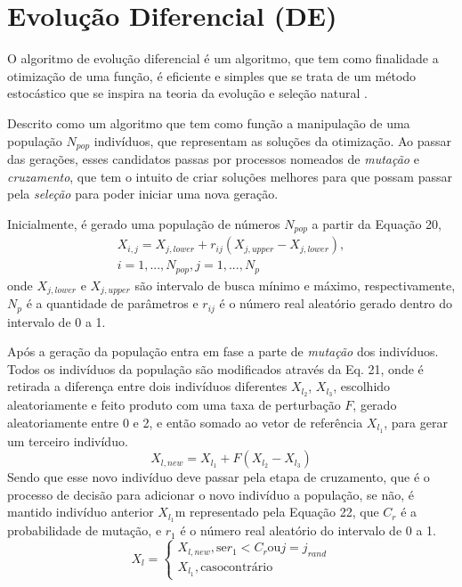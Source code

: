 \documentclass[por]{Template_SBEF}
\begin{document}
\section{Evolução Diferencial (DE)}
O algoritmo de evolução diferencial é um algoritmo, que tem como finalidade a otimização de uma função, é eficiente e simples que se trata de um método estocástico que se inspira na teoria da evolução e seleção natural \cite{Storn}.

Descrito como um algoritmo que tem como função a manipulação de uma população $N_{pop}$ indivíduos, que representam as soluções da otimização\cite{leppaus}. Ao passar das gerações, esses candidatos passas por processos nomeados de \textit{mutação} e \textit{cruzamento}, que tem o intuito de criar soluções melhores para que possam passar pela \textit{seleção} para poder iniciar uma nova geração.

Inicialmente, é gerado uma população de números $N_{pop}$ a partir da Equação 20,
\begin{equation}
\begin{split}
X_{i,j}=X_{j,lower}+r_{ij} (X_{j,upper}-X_{j,lower}),\\
i = 1,...,N_{pop}, j =1, ..., N_p
\end{split}
\end{equation}
onde $X_{j,lower}$ e $X_{j,upper}$ são intervalo de busca mínimo e máximo, respectivamente, $N_p$ é a quantidade de parâmetros e $r_{ij}$ é o número real aleatório gerado dentro do intervalo de 0 a 1.

Após a geração da população entra em fase a parte de \textit{mutação} dos indivíduos. Todos os indivíduos da população são modificados através da Eq. 21, onde é retirada a diferença entre dois indivíduos  diferentes $X_{l_2}$, $X_{l_3}$, escolhido aleatoriamente e feito produto com uma taxa de perturbação $F$, gerado aleatoriamente entre 0 e 2, e então somado ao vetor de referência $X_{l_1}$, para gerar um terceiro indivíduo.
\begin{equation}
X_{l,new}=X_{l_1} + F(X_{l_2} - X_{l_3})
\end{equation}
Sendo que esse novo indivíduo deve passar pela etapa de cruzamento, que é o processo de decisão para adicionar o novo indivíduo a população, se não, é mantido  indivíduo anterior $X_{l_1}$m representado pela Equação 22, que $C_r$ é a probabilidade de mutação, e $r_1$ é o número real aleatório do intervalo de 0 a 1.
\begin{equation}
X_l= \left\{\begin{matrix}
X_{l,new}, \mathrm{se} r_1 < C_r \mathrm{ou} j = j_{rand}\\
 X_{l_1}, \mathrm{caso contrário}

\end{matrix}\right.
\end{equation}
\end{document}
